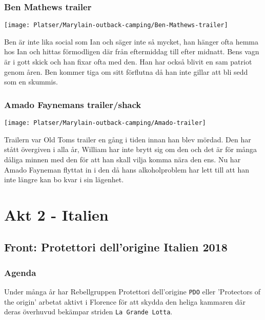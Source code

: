 \documentclass[a5paper,10pt]{report}
\begin{document}
\subsection{Ben Mathews trailer}
\texttt{[image: Platser/Marylain-outback-camping/Ben-Mathews-trailer]}

Ben är inte lika social som Ian och säger inte så mycket, han hänger ofta hemma hos Ian och hittas förmodligen där från eftermiddag till efter midnatt. Bens vagn är i gott skick och han fixar ofta med den. Han har också blivit en sam patriot genom åren. Ben kommer tiga om sitt förflutna då han inte gillar att bli sedd som en skummis.
\clearpage
\subsection{Amado Faynemans trailer/shack}
\texttt{[image: Platser/Marylain-outback-camping/Amado-trailer]}

Trailern var Old Toms trailer en gång i tiden innan han blev mördad. Den har stått övergiven i alla år, William har inte brytt sig om den och det är för många dåliga minnen med den för att han skall vilja komma nära den ens. Nu har Amado Fayneman flyttat in i den då hans alkoholproblem har lett till att han inte längre kan bo kvar i sin lägenhet.
\chapter{Akt 2 - Italien}
\section{Front: Protettori dell'origine Italien 2018}
\subsection{Agenda}
Under många år har Rebellgruppen Protettori dell'origine \texttt{PDO} eller 'Protectors of the origin' arbetat aktivt i Florence för att skydda den heliga kammaren där deras överhuvud bekämpar striden \texttt{La Grande Lotta}.
\end{document}
